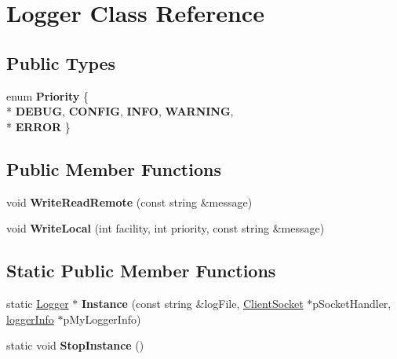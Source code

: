 \hypertarget{classLogger}{\section{Logger Class Reference}
\label{classLogger}
}
\subsection*{Public Types}
\begin{DoxyCompactItemize}
\item 
enum {\bfseries Priority} \{ \\*
{\bfseries D\-E\-B\-U\-G}, 
{\bfseries C\-O\-N\-F\-I\-G}, 
{\bfseries I\-N\-F\-O}, 
{\bfseries W\-A\-R\-N\-I\-N\-G}, 
\\*
{\bfseries E\-R\-R\-O\-R}
 \}
\end{DoxyCompactItemize}
\subsection*{Public Member Functions}
\begin{DoxyCompactItemize}
\item 
\hypertarget{classLogger_ad766b6ac85f82411a6f25af21eea58d7}{void {\bfseries Write\-Read\-Remote} (const string \&message)}\label{classLogger_ad766b6ac85f82411a6f25af21eea58d7}

\item 
\hypertarget{classLogger_a16da1083e70f46051275d4ac208c3626}{void {\bfseries Write\-Local} (int facility, int priority, const string \&message)}\label{classLogger_a16da1083e70f46051275d4ac208c3626}

\end{DoxyCompactItemize}
\subsection*{Static Public Member Functions}
\begin{DoxyCompactItemize}
\item 
\hypertarget{classLogger_aa35f17d5b79217f4b5c43dcb44b97746}{static \hyperlink{classLogger}{Logger} $\ast$ {\bfseries Instance} (const string \&log\-File, \hyperlink{classClientSocket}{Client\-Socket} $\ast$p\-Socket\-Handler, \hyperlink{structloggerInfo}{logger\-Info} $\ast$p\-My\-Logger\-Info)}\label{classLogger_aa35f17d5b79217f4b5c43dcb44b97746}

\item 
\hypertarget{classLogger_a45f0936b9f16c4f8f93ca409a9486e94}{static void {\bfseries Stop\-Instance} ()}\label{classLogger_a45f0936b9f16c4f8f93ca409a9486e94}

\end{DoxyCompactItemize}
